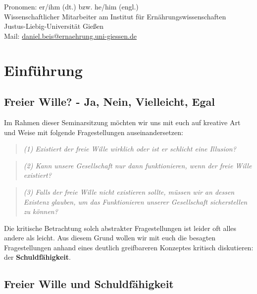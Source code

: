 \documentclass[
  a4paper,
]{report}
\begin{document}
Pronomen: er/ihm (dt.) bzw. he/him (engl.)\\
Wissenschaftlicher Mitarbeiter am Institut für Ernährungswissenschaften\\
Justus-Liebig-Universität Gießen\\

Mail: \href{mailto:?subject=Seminar\%20Freier\%20Wille\%20als\%20Illusion\%20oder\%20Notwendigkeit\%20-\%20Universität\%20Konstanz}{daniel.beis@ernaehrung.uni-giessen.de}

\hypertarget{einfuxfchrung}{%
\chapter{Einführung}\label{einfuxfchrung}}

\hypertarget{freier-wille---ja-nein-vielleicht-egal}{%
\section{Freier Wille? - Ja, Nein, Vielleicht, Egal}\label{freier-wille---ja-nein-vielleicht-egal}}

Im Rahmen dieser Seminarsitzung möchten wir uns mit euch auf kreative Art und Weise mit folgende Fragestellungen auseinandersetzen:

\begin{quote}
\emph{(1) Existiert der freie Wille wirklich oder ist er schlicht eine Illusion?}
\end{quote}

\begin{quote}
\emph{(2) Kann unsere Gesellschaft nur dann funktionieren, wenn der freie Wille existiert?}
\end{quote}

\begin{quote}
\emph{(3) Falls der freie Wille nicht existieren sollte, müssen wir an dessen Existenz glauben, um das Funktionieren unserer Gesellschaft sicherstellen zu können?}
\end{quote}

Die kritische Betrachtung solch abstrakter Fragestellungen ist leider oft alles andere als leicht. Aus diesem Grund wollen wir mit euch die besagten Fragestellungen anhand eines deutlich greifbareren Konzeptes kritisch diskutieren: der \textbf{Schuldfähigkeit}.

\hypertarget{freier-wille-und-schuldfuxe4higkeit}{%
\section{Freier Wille und Schuldfähigkeit}\label{freier-wille-und-schuldfuxe4higkeit}}
\end{document}

